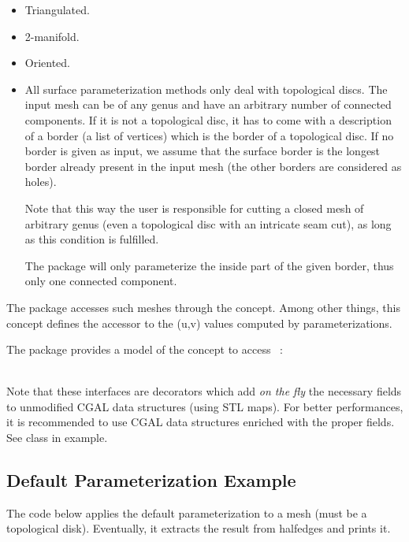 \begin{itemize}

\item Triangulated.

\item 2-manifold.

\item Oriented.

\item All surface parameterization methods only deal with topological discs.
The input mesh can be of any genus and have an arbitrary number of
connected components.  If it is not a topological disc, it has to come
with a description of a border (a list of vertices) which is the
border of a topological disc.  If no border is given as input, we
assume that the surface border is the longest border already
present in the input mesh (the other borders are considered as
holes).

Note that this way the user is responsible for cutting a closed mesh
of arbitrary genus (even a topological disc with an intricate seam
cut), as long as this condition is fulfilled.

The package will only parameterize the inside part of the given
border, thus only one connected component.

\end{itemize}

The package accesses such meshes through the
 concept. Among other things, this concept
defines the accessor to the (u,v) values computed by
parameterizations.

The package provides a model of the concept
 to access \cgal\ :

  \\

Note that these interfaces are decorators which add {\em on the fly}
the necessary fields to unmodified CGAL data structures (using STL
maps). For better performances, it is recommended to use CGAL data
structures enriched with the proper fields. See 
class in  example.


\subsection{Default Parameterization Example}

The code below applies the default parameterization to a
 mesh (must be a topological disk).
Eventually, it extracts the result from halfedges and prints it.

